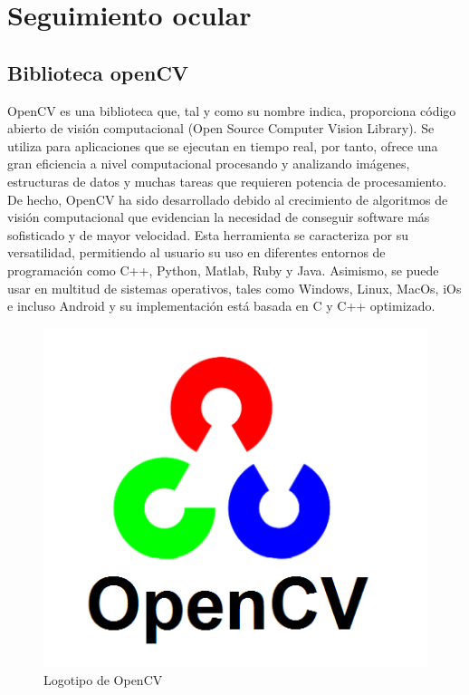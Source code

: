 \newpage
\section{Seguimiento ocular} \label{s2_2}

\subsection{Biblioteca openCV} \label{s2_2_1}

OpenCV es una biblioteca que, tal y como su nombre indica, proporciona código abierto de visión computacional (Open Source Computer Vision Library). Se utiliza para aplicaciones que se ejecutan en tiempo real, por tanto, ofrece una gran eficiencia a nivel computacional procesando y analizando imágenes, estructuras de datos y muchas tareas que requieren potencia de procesamiento. De hecho, OpenCV ha sido desarrollado debido al crecimiento de algoritmos de visión computacional que evidencian la necesidad de conseguir software más sofisticado y de mayor velocidad. 
Esta herramienta se caracteriza por su versatilidad, permitiendo al usuario su uso en diferentes entornos de programación como C++, Python, Matlab, Ruby y Java. Asimismo, se puede usar en multitud de sistemas operativos, tales como Windows, Linux, MacOs, iOs e incluso Android y su implementación está basada en C y C++ optimizado.

\begin{figure}[H]
\centering
\includegraphics[scale = 0.5]{capitulo_02/figuras_dir/OpenCV.jpg}
\caption{Logotipo de OpenCV}
\end{figure}

